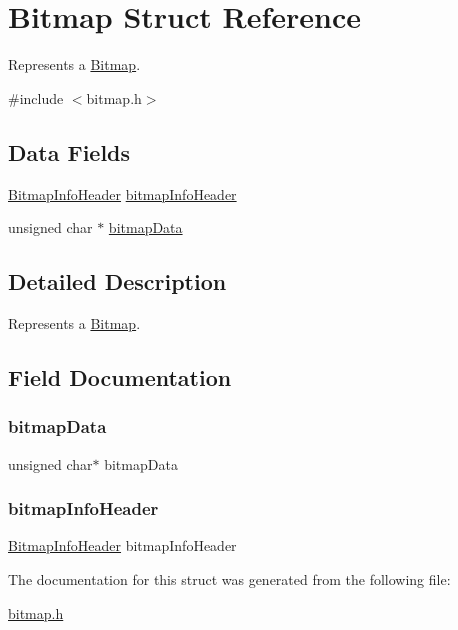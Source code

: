 \hypertarget{struct_bitmap}{}\section{Bitmap Struct Reference}
\label{struct_bitmap}


Represents a \hyperlink{struct_bitmap}{Bitmap}.  




{\ttfamily \#include $<$bitmap.\+h$>$}

\subsection*{Data Fields}
\begin{DoxyCompactItemize}
\item 
\hyperlink{struct_bitmap_info_header}{Bitmap\+Info\+Header} \hyperlink{struct_bitmap_a7157ca7f3ce4be47481c472fafd89313}{bitmap\+Info\+Header}
\item 
unsigned char $\ast$ \hyperlink{struct_bitmap_a586c4bcc42cf22a033e8f60f24f627f0}{bitmap\+Data}
\end{DoxyCompactItemize}


\subsection{Detailed Description}
Represents a \hyperlink{struct_bitmap}{Bitmap}. 

\subsection{Field Documentation}
\mbox{\label{struct_bitmap_a586c4bcc42cf22a033e8f60f24f627f0}} 
\subsubsection{\texorpdfstring{bitmap\+Data}{bitmapData}}
{\footnotesize\ttfamily unsigned char$\ast$ bitmap\+Data}

\mbox{\label{struct_bitmap_a7157ca7f3ce4be47481c472fafd89313}} 
\subsubsection{\texorpdfstring{bitmap\+Info\+Header}{bitmapInfoHeader}}
{\footnotesize\ttfamily \hyperlink{struct_bitmap_info_header}{Bitmap\+Info\+Header} bitmap\+Info\+Header}



The documentation for this struct was generated from the following file\+:\begin{DoxyCompactItemize}
\item 
\hyperlink{bitmap_8h}{bitmap.\+h}\end{DoxyCompactItemize}
